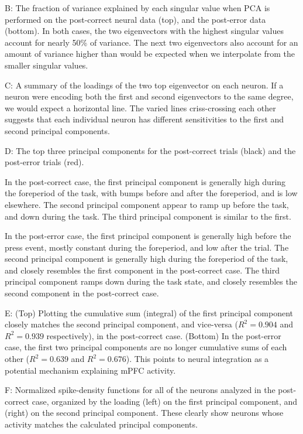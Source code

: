 \documentclass[12pt]{article}
\begin{document}
B: The fraction of variance explained
by each singular value
when PCA is performed on the post-correct neural data
(top), and the post-error data (bottom).
In both cases, the two eigenvectors with the highest
singular values account for nearly 50\% of variance.
The next two eigenvectors also account for an amount
of variance higher than would be expected when
we interpolate from the smaller
singular values.

C: A summary of the loadings of the two top
eigenvector on each neuron.
If a neuron were encoding both the first and second
eigenvectors to the same degree,
we would expect a horizontal line.
The varied lines criss-crossing each other
suggests that each individual neuron
has different sensitivities
to the first and second principal components.

D: The top three principal components
for the post-correct trials (black)
and the post-error trials (red).

In the post-correct case,
the first principal component is generally high
during the foreperiod of the task, with bumps
before and after the foreperiod, and is low elsewhere.
The second principal component appear to ramp up
before the task, and down during the task.
The third principal component is similar
to the first.

In the post-error case,
the first principal component is generally high
before the press event, mostly constant during
the foreperiod, and low after the trial.
The second principal component is generally high
during the foreperiod of the task,
and closely resembles the first component
in the post-correct case.
The third principal component ramps down
during the task state, and closely resembles
the second component in the post-correct case.

E: (Top) Plotting the cumulative sum (integral)
of the first principal component closely matches
the second principal component, and vice-versa
($R^2 = 0.904$ and $R^2 = 0.939$ respectively),
in the post-correct case.
(Bottom) In the post-error case,
the first two principal components are no longer
cumulative sums of each other
($R^2 = 0.639$ and $R^2 = 0.676$).
This points to neural integration
as a potential mechanism explaining mPFC activity.

F: Normalized spike-density functions
for all of the neurons analyzed in the post-correct case,
organized by the loading
(left) on the first principal component, and
(right) on the second principal component.
These clearly show neurons whose activity
matches the calculated principal components.
\end{document}
